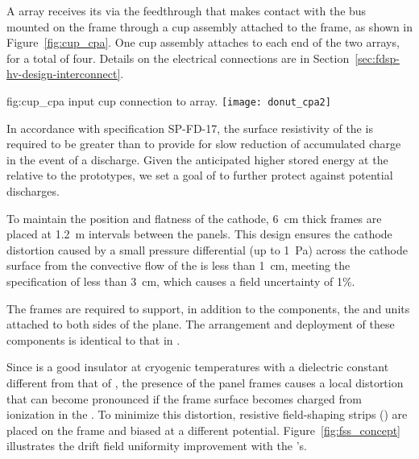 A  array receives its  via the feedthrough that makes contact with the  bus mounted on the  frame through a cup assembly attached to the frame, as shown in Figure~\ref{fig:cup_cpa}. 
One cup assembly attaches to each end of the two  arrays, for a total of four. Details on the electrical connections are in Section~\ref{sec:fdsp-hv-design-interconnect}.

\begin{dunefigure}{fig:cup_cpa}{ input cup connection to  array.}
\texttt{[image: donut\_cpa2]} %
\end{dunefigure}

In accordance with specification SP-FD-17, %
the surface resistivity of the  is required to be greater than \cathodemegohm to provide for slow reduction of accumulated charge in the event of a discharge.  Given the anticipated higher stored energy at the  
relative to the prototypes, we set a goal of \cathodegigohm to further  protect against potential discharges.  
 
To maintain the position and flatness of the cathode, 
\SI{6}{cm} thick \frfour frames are placed at \SI{1.2}{m} intervals between the  panels. This design ensures the cathode distortion caused by a small pressure differential (up to \SI{1}{Pa}) across the cathode surface from the convective flow of the \lar is less than \SI{1}{cm}, meeting the specification of less than \SI{3}{cm}, which causes a field uncertainty of 1\%.


The  frames are required to support, in addition to the  components, the  and  units attached to both sides of the  plane. %
The arrangement and deployment of these components is identical to that in .  

 Since \frfour is a good insulator at cryogenic temperatures with a dielectric constant different from that of \lar, the presence of the  panel frames causes a local \efield distortion that can become pronounced if the frame surface becomes charged 
from ionization in the .  To minimize this distortion, resistive field-shaping strips () are placed on the frame and biased at a different potential.  Figure~\ref{fig:fss_concept} illustrates the drift field uniformity improvement with the 's.

